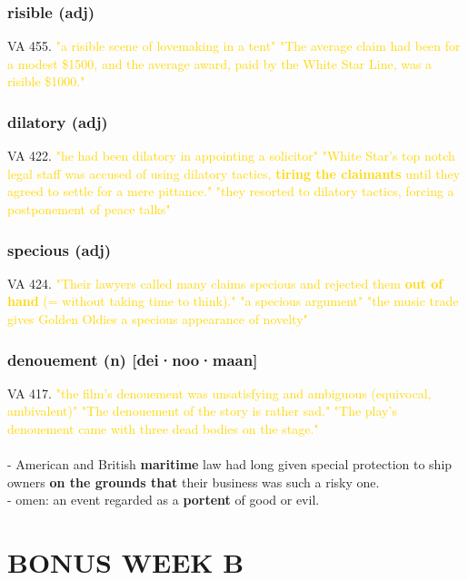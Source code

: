 \documentclass{proc}
\begin{document}
	\subsubsection{\textcolor{brickred}{risible} (adj)}
	VA 455.
	\textcolor{gold}{"a risible scene of lovemaking in a tent" "The average claim had been for a modest \$1500, and the average award, paid by the White Star Line, was a risible \$1000."}
	
	\subsubsection{\textcolor{brickred}{dilatory} (adj)}
	VA 422.
	\textcolor{gold}{"he had been dilatory in appointing a solicitor" "White Star's top notch legal staff was accused of using dilatory tactics, \textbf{tiring the claimants} until they agreed to settle for a  mere pittance." "they resorted to dilatory tactics, forcing a postponement of peace talks"}
	
	\subsubsection{\textcolor{brickred}{specious} (adj)}
	VA 424.
	\textcolor{gold}{"Their lawyers called many claims specious and rejected them \textbf{out of hand} (= without taking time to think)." "a specious argument" "the music trade gives Golden Oldies a specious appearance of novelty"}
	
	\subsubsection{\textcolor{brickred}{denouement} (n) [dei·noo·maan]}
	VA 417.
	\textcolor{gold}{"the film's denouement was unsatisfying and ambiguous (equivocal, ambivalent)" "The denouement of the story is rather sad." "The play's denouement came with three dead bodies on the stage."}\\\\
	- American and British \textbf{maritime} law had long given special protection to ship owners \textbf{on the grounds that} their business was such a risky one.\\
	- omen: an event regarded as a \textbf{portent} of good or evil.
	
	\newpage
	\setcounter{section}{47}
	\setcounter{subsection}{0}
	
	\section{BONUS WEEK B}
\end{document}

